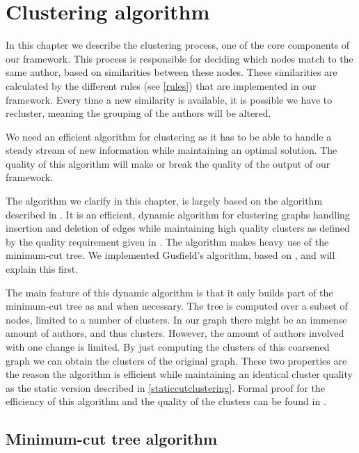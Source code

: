 \chapter{Clustering algorithm}

In this chapter we describe the clustering process, one of the core components of our framework. This process is responsible for deciding which nodes match to the same author, based on similarities between these nodes. These similarities are calculated by the different rules (see \autoref{rules}) that are implemented in our framework. Every time a new similarity is available, it is possible we have to recluster, meaning the grouping of the authors will be altered.

We need an efficient algorithm for clustering as it has to be able to handle a steady stream of new information while maintaining an optimal solution. The quality of this algorithm will make or break the quality of the output of our framework.

The algorithm we clarify in this chapter, is largely based on the algorithm described in \cite{saha2006dynamic}. It is an efficient, dynamic algorithm for clustering graphs handling insertion and deletion of edges while maintaining high quality clusters as defined by the quality requirement given in \cite{flake2004graph}. The algorithm makes heavy use of the minimum-cut tree. We implemented Gusfield's algorithm, based on \cite{rodrigues2011mpi}, and will explain this first.

The main feature of this dynamic algorithm is that it only builds part of the minimum-cut tree as and when necessary. The tree is computed over a subset of nodes, limited to a number of clusters. In our graph there might be an immense amount of authors, and thus clusters. However, the amount of authors involved with one change is limited. By just computing the clusters of this coarsened graph we can obtain the clusters of the original graph. These two properties are the reason the algorithm is efficient while maintaining an identical cluster quality as the static version described in \autoref{staticcutclustering}. Formal proof for the efficiency of this algorithm and the quality of the clusters can be found in \cite{saha2006dynamic}.

\section{Minimum-cut tree algorithm}
\label{minimumcuttree}

